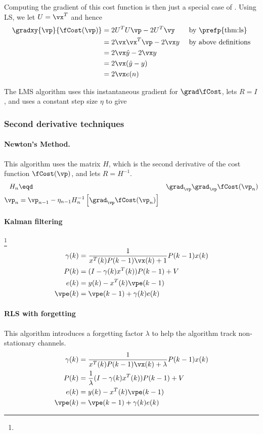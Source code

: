 Computing the gradient of this cost function is then
just a special case of  .
Using LS, we let $U=\vx^T$ and hence
\begin{align*}
   \gradxy{\vp}{\fCost(\vp)}
   &= 2U^TU \vp -2U^T\vy                   && \text{ by \prefp{thm:ls}}
\\ &= 2\vx\vx^T \vp -2\vx y               && \text{ by above definitions}
\\ &= 2\vx\hat{y} -2\vx y                    && \text{ }
\\ &= 2\vx(\hat{y} -y)                      && \text{ }
\\ &= 2\vx e(n)                && \text{ }
\end{align*}

The LMS algorithm uses this instantaneous gradient for $\grad\fCost$,
lets $R=I$, and uses a constant step size $\eta$ to give
\subsubsection*{Second derivative techniques}
\paragraph{Newton's Method.}
This algorithm uses the  matrix $H$,
which is the second derivative of the cost function $\fCost(\vp)$,
and lets $R=H^{-1}$.
\begin{align*}
   H_n &\eqd& \grad_\vp\grad_\vp \fCost(\vp_n)
\\
   \vp_n &= \vp_{n-1} - \eta_{n-1} H_n^{-1} \left[\grad_\vp\fCost(\vp_n)\right]
\end{align*}


\paragraph{Kalman filtering}\footnote{}
\begin{align*}
   \gamma(k) &= \frac{1}{x^T(k)P(k-1)\vx(k)+1}P(k-1)x(k) \\
   P(k) &= (I-\gamma(k)x^T(k))P(k-1)+V \\
   e(k) &= y(k) - x^T(k)\vpe(k-1) \\
   \vpe(k) &= \vpe(k-1) + \gamma(k)e(k)
\end{align*}

\paragraph{RLS with forgetting}
This algorithm introduces a forgetting factor $\lambda$
to help the algorithm track non-stationary channels.
\begin{align*}
   \gamma(k) &= \frac{1}{x^T(k)P(k-1)\vx(k)+\lambda}  P(k-1)x(k) \\
   P(k) &= \frac{1}{\lambda}(I-\gamma(k)x^T(k))P(k-1)+V \\
   e(k) &= y(k) - x^T(k)\vpe(k-1) \\
   \vpe(k) &= \vpe(k-1) + \gamma(k)e(k)
\end{align*}
\fi

